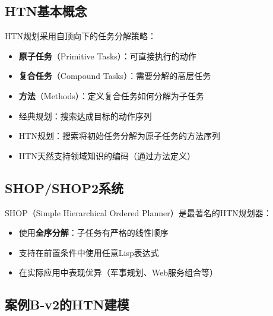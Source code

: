 \subsection{HTN基本概念}

\begin{definition}
HTN规划采用自顶向下的任务分解策略：
\begin{itemize}
  \item \textbf{原子任务}（Primitive Tasks）：可直接执行的动作
  \item \textbf{复合任务}（Compound Tasks）：需要分解的高层任务
  \item \textbf{方法}（Methods）：定义复合任务如何分解为子任务
\end{itemize}
\end{definition}

\begin{keypoint}
\begin{itemize}
  \item 经典规划：搜索达成目标的动作序列
  \item HTN规划：搜索将初始任务分解为原子任务的方法序列
  \item HTN天然支持领域知识的编码（通过方法定义）
\end{itemize}
\end{keypoint}

\subsection{SHOP/SHOP2系统}

SHOP（Simple Hierarchical Ordered Planner）是最著名的HTN规划器：

\begin{itemize}[leftmargin=2em]
  \item 使用\textbf{全序分解}：子任务有严格的线性顺序
  \item 支持在前置条件中使用任意Lisp表达式
  \item 在实际应用中表现优异（军事规划、Web服务组合等）
\end{itemize}

\subsection{案例B-v2的HTN建模}

